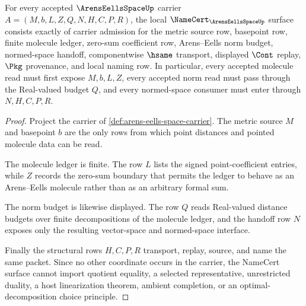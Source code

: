 \begin{theorem}
\label{thm:arens-eells-space-namecert-obligations}
For every accepted $\ArensEellsSpaceUp$ carrier $A=(M,b,L,Z,Q,N,H,C,P,R)$, the local $\NameCert_{\ArensEellsSpaceUp}$ surface consists exactly of carrier admission for the metric source row, basepoint row, finite molecule ledger, zero-sum coefficient row, Arens--Eells norm budget, normed-space handoff, componentwise $\hsame$ transport, displayed $\Cont$ replay, $\Pkg$ provenance, and local naming row. In particular, every accepted molecule read must first expose $M,b,L,Z$, every accepted norm read must pass through the Real-valued budget $Q$, and every normed-space consumer must enter through $N,H,C,P,R$.
\end{theorem}
\begin{proof}
Project the carrier of \autoref{def:arens-eells-space-carrier}. The metric source $M$ and basepoint $b$ are the only rows from which point distances and pointed molecule data can be read.

The molecule ledger is finite. The row $L$ lists the signed point-coefficient entries, while $Z$ records the zero-sum boundary that permits the ledger to behave as an Arens--Eells molecule rather than as an arbitrary formal sum.

The norm budget is likewise displayed. The row $Q$ reads Real-valued distance budgets over finite decompositions of the molecule ledger, and the handoff row $N$ exposes only the resulting vector-space and normed-space interface.

Finally the structural rows $H,C,P,R$ transport, replay, source, and name the same packet. Since no other coordinate occurs in the carrier, the NameCert surface cannot import quotient equality, a selected representative, unrestricted duality, a host linearization theorem, ambient completion, or an optimal-decomposition choice principle.
\end{proof}

